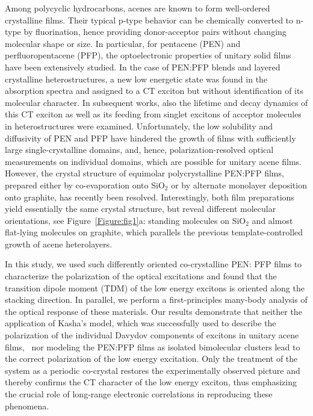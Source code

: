 \documentclass[journal=jpclcd,manuscript=letter]{achemso}
\begin{document}
Among polycyclic hydrocarbons, acenes are known to form
well-ordered crystalline films.\cite{anth06cr} Their typical p-type behavior can be chemically converted to n-type by fluorination,\cite{tang-bao11cm} hence providing donor-acceptor pairs without changing molecular shape or size. In particular, for pentacene (PEN) and perfluoropentacene (PFP),\cite{sako+04jacs} the optoelectronic properties of unitary solid films have been extensively studied.\cite{hind+07jpc, breu-witt11prb,smit-mich13arpc,kola+04acsn,cocc+18pccp} In the case of PEN:PFP blends and layered crystalline 
heterostructures, a new low energetic state was found in the absorption spectra and assigned to a CT exciton but without identification of its molecular character.\cite{broc+11prb,ange+12jcp,breu-witt13jcp} In subsequent works, also the lifetime and decay dynamics of this CT exciton as well as its feeding from singlet excitons of acceptor molecules in heterostructures were examined.\cite{drinn+17ami,broc+17pssrrl,kim+19jcp,hans+21ami} Unfortunately, the low solubility and diffusivity of PEN and PFP have hindered the growth of films with sufficiently large single-crystalline domains, and, hence,
polarization-resolved optical measurements on individual domains, which are possible for unitary acene films.\cite{breu-witt11prb,kola+04acsn,cocc+18pccp,helt+11apl,gund+20ami} However, the crystal structure of equimolar polycrystalline PEN:PFP films, prepared either by co-evaporation onto SiO$_2$ or by alternate monolayer deposition onto graphite, has recently been resolved. Interestingly, both film preparations yield essentially the same crystal structure, but reveal different molecular orientations, see Figure~\ref{Figure:fig1}a: standing molecules on SiO$_2$ and almost flat-lying molecules on graphite,\cite{davi+20cm} which parallels the previous template-controlled growth of acene heterolayers.~\cite{breu-witt15acsami}

In this study, we used such differently oriented co-crystalline PEN: PFP films to characterize the polarization of the optical excitations and found that the transition dipole moment (TDM) of the low energy excitons is oriented along the stacking direction. In parallel, we perform a first-principles many-body analysis of the optical response of these materials. 
Our results demonstrate that neither the application of Kasha's model,\cite{kash+65}
which was successfully used to describe the polarization of the individual Davydov components of excitons in unitary acene films,~\cite{gund+20ami} nor modeling the PEN:PFP films as isolated bimolecular clusters lead to the correct polarization of the low energy excitation. 
Only the treatment of the system as a periodic co-crystal restores the experimentally observed picture and thereby confirms the CT character of the low energy exciton, thus emphasizing the crucial role of long-range electronic correlations in reproducing these phenomena.~\cite{guer+21jpcc}
\end{document}
